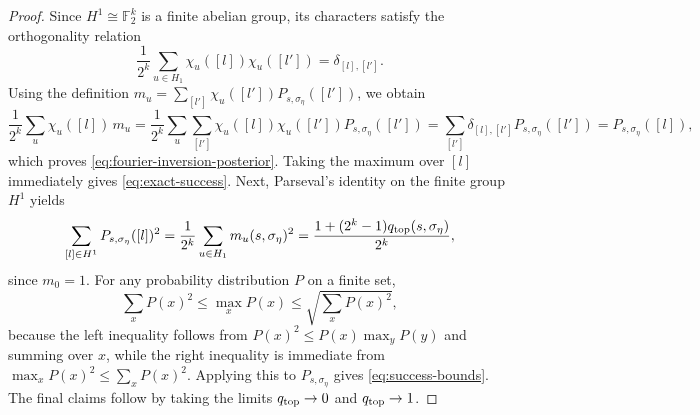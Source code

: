 \documentclass[twoside,english,aps,showpacs,pra,superscriptaddress]{revtex4-2}
\begin{document}
\begin{proof}
Since \(H^1\cong \mathbb F_2^k\) is a finite abelian group, its characters satisfy the orthogonality relation
\begin{equation}
    \frac{1}{2^k}\sum_{u\in H_1} \chi_u([l])\chi_u([l'])=\delta_{[l],[l']}.
\end{equation}
Using the definition \(m_u=\sum_{[l']} \chi_u([l'])P_{s,\sigma_\eta}([l'])\), we obtain
\begin{equation}
    \frac{1}{2^k}\sum_{u} \chi_u([l])\,m_u
    =\frac{1}{2^k}\sum_{u}\sum_{[l']} \chi_u([l])\chi_u([l'])P_{s,\sigma_\eta}([l'])
    =\sum_{[l']} \delta_{[l],[l']} P_{s,\sigma_\eta}([l'])
    =P_{s,\sigma_\eta}([l]),
\end{equation}
which proves \eqref{eq:fourier-inversion-posterior}. Taking the maximum over \([l]\) immediately gives \eqref{eq:exact-success}. Next, Parseval's identity on the finite group \(H^1\) yields
\begin{equation}
    \sum_{[l]\in H^1} P_{s,\sigma_\eta}([l])^2
    =\frac{1}{2^k}\sum_{u\in H_1} m_u(s,\sigma_\eta)^2
    =\frac{1+(2^k-1)q_{\rm top}(s,\sigma_\eta)}{2^k},
\end{equation}
since \(m_0=1\). For any probability distribution \(P\) on a finite set,
\begin{equation}
    \sum_x P(x)^2 \le \max_x P(x)\le \sqrt{\sum_x P(x)^2},
\end{equation}
because the left inequality follows from \(P(x)^2\le P(x)\max_y P(y)\) and summing over \(x\), while the right inequality is immediate from \(\max_x P(x)^2\le \sum_x P(x)^2\). Applying this to \(P_{s,\sigma_\eta}\) gives \eqref{eq:success-bounds}. The final claims follow by taking the limits \(q_{\rm top}\to 0\) and \(q_{\rm top}\to 1\).
\end{proof}
\end{document}
